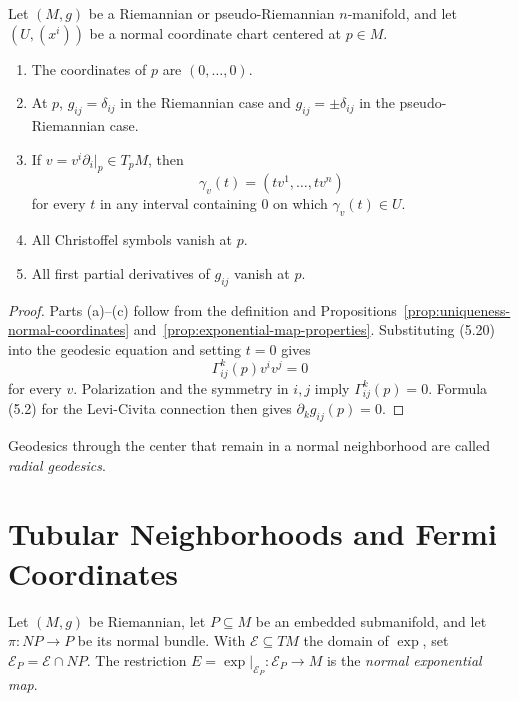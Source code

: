 \begin{proposition}
\label{prop:properties-normal-coordinates}


Let $(M,g)$ be a Riemannian or pseudo-Riemannian $n$-manifold, and let
$(U,(x^i))$ be a normal coordinate chart centered at $p\in M$.
\begin{enumerate}
\item[(a)] The coordinates of $p$ are $(0,\ldots,0)$.
\item[(b)] At $p$, $g_{ij}=\delta_{ij}$ in the Riemannian case and
$g_{ij}=\pm\delta_{ij}$ in the pseudo-Riemannian case.
\item[(c)] If $v=v^i\partial_i|_p\in T_pM$, then
\begin{equation}
\gamma_v(t)=(tv^1,\ldots,tv^n) \tag{5.20}
\end{equation}
for every $t$ in any interval containing $0$ on which $\gamma_v(t)\in U$.
\item[(d)] All Christoffel symbols vanish at $p$.
\item[(e)] All first partial derivatives of $g_{ij}$ vanish at $p$.
\end{enumerate}

\begin{proof}
\sketch
Parts (a)--(c) follow from the definition and
Propositions~\ref{prop:uniqueness-normal-coordinates}
and~\ref{prop:exponential-map-properties}.  Substituting (5.20) into the
geodesic equation and setting $t=0$ gives
\[
\Gamma^k_{ij}(p)v^iv^j=0
\]
for every $v$.  Polarization and the symmetry in $i,j$ imply
$\Gamma^k_{ij}(p)=0$.  Formula (5.2) for the Levi-Civita connection then gives
$\partial_k g_{ij}(p)=0$.
\end{proof}
\end{proposition}

Geodesics through the center that remain in a normal neighborhood are called
\emph{radial geodesics}.

\section{Tubular Neighborhoods and Fermi Coordinates}

Let $(M,g)$ be Riemannian, let $P\subseteq M$ be an embedded submanifold, and
let $\pi:NP\to P$ be its normal bundle.  With $\mathcal E\subseteq TM$ the
domain of $\exp$, set $\mathcal E_P=\mathcal E\cap NP$.  The restriction
$E=\exp|_{\mathcal E_P}:\mathcal E_P\to M$ is the \emph{normal exponential
map}.

